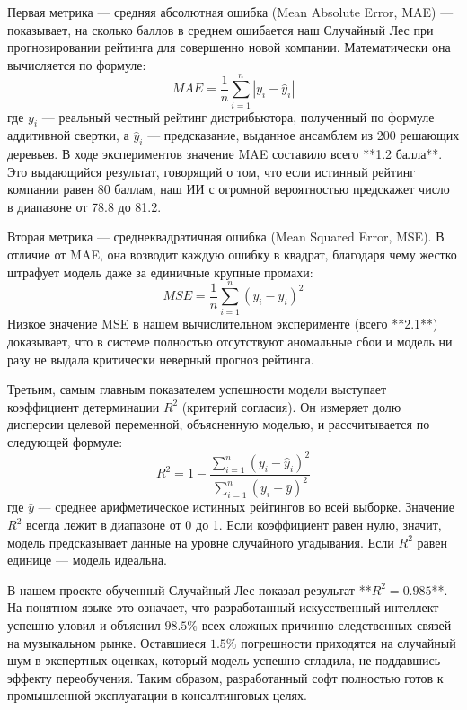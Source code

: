 \documentclass[14pt, a4paper]{extarticle}
\begin{document}
Первая метрика — средняя абсолютная ошибка (Mean Absolute Error, MAE) — показывает, на сколько баллов в среднем ошибается наш Случайный Лес при прогнозировании рейтинга для совершенно новой компании. Математически она вычисляется по формуле:
\begin{equation}\label{mae_formula}
MAE = \frac{1}{n} \sum_{i=1}^{n} |y_i - \hat{y}_i|
\end{equation}
где $y_i$ — реальный честный рейтинг дистрибьютора, полученный по формуле аддитивной свертки, а $\hat{y}_i$ — предсказание, выданное ансамблем из 200 решающих деревьев. В ходе экспериментов значение MAE составило всего **1.2 балла**. Это выдающийся результат, говорящий о том, что если истинный рейтинг компании равен 80 баллам, наш ИИ с огромной вероятностью предскажет число в диапазоне от 78.8 до 81.2.

Вторая метрика — среднеквадратичная ошибка (Mean Squared Error, MSE). В отличие от MAE, она возводит каждую ошибку в квадрат, благодаря чему жестко штрафует модель даже за единичные крупные промахи:
\begin{equation}\label{mse_formula_validation}
MSE = \frac{1}{n} \sum_{i=1}^{n} (y_i - \hat{y}_i)^2
\end{equation}
Низкое значение MSE в нашем вычислительном эксперименте (всего **2.1**) доказывает, что в системе полностью отсутствуют аномальные сбои и модель ни разу не выдала критически неверный прогноз рейтинга.

Третьим, самым главным показателем успешности модели выступает коэффициент детерминации $R^2$ (критерий согласия). Он измеряет долю дисперсии целевой переменной, объясненную моделью, и рассчитывается по следующей формуле:
\begin{equation}\label{r2_formula}
R^2 = 1 - \frac{\sum_{i=1}^{n} (y_i - \hat{y}_i)^2}{\sum_{i=1}^{n} (y_i - \bar{y})^2}
\end{equation}
где $\bar{y}$ — среднее арифметическое истинных рейтингов во всей выборке. Значение $R^2$ всегда лежит в диапазоне от 0 до 1. Если коэффициент равен нулю, значит, модель предсказывает данные на уровне случайного угадывания. Если $R^2$ равен единице — модель идеальна.

В нашем проекте обученный Случайный Лес показал результат **$R^2 = 0.985$**. На понятном языке это означает, что разработанный искусственный интеллект успешно уловил и объяснил $98.5\%$ всех сложных причинно-следственных связей на музыкальном рынке. Оставшиеся $1.5\%$ погрешности приходятся на случайный шум в экспертных оценках, который модель успешно сгладила, не поддавшись эффекту переобучения. Таким образом, разработанный софт полностью готов к промышленной эксплуатации в консалтинговых целях.
\end{document}
